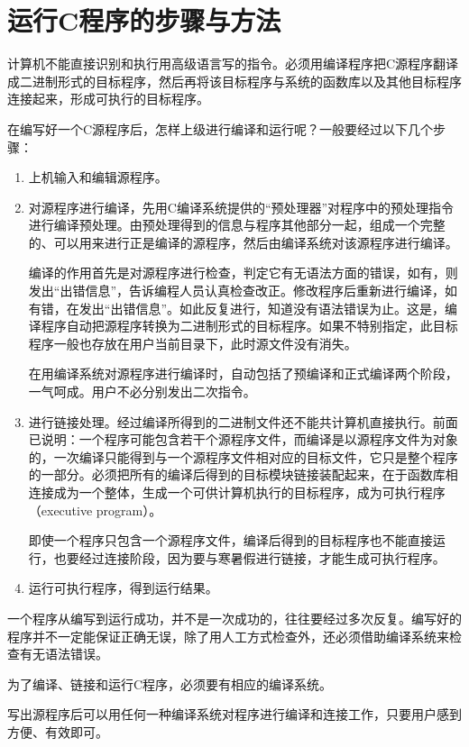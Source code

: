 \section{运行C程序的步骤与方法}

 计算机不能直接识别和执行用高级语言写的指令。必须用编译程序把C源程序翻译成二进制形式的目标程序，然后再将该目标程序与系统的函数库以及其他目标程序连接起来，形成可执行的目标程序。

 在编写好一个C源程序后，怎样上级进行编译和运行呢？一般要经过以下几个步骤：
\begin{enumerate}
	\item 	上机输入和编辑源程序。
	\item 对源程序进行编译，先用C编译系统提供的“预处理器”对程序中的预处理指令进行编译预处理。由预处理得到的信息与程序其他部分一起，组成一个完整的、可以用来进行正是编译的源程序，然后由编译系统对该源程序进行编译。

 编译的作用首先是对源程序进行检查，判定它有无语法方面的错误，如有，则发出“出错信息”，告诉编程人员认真检查改正。修改程序后重新进行编译，如有错，在发出“出错信息”。如此反复进行，知道没有语法错误为止。这是，编译程序自动把源程序转换为二进制形式的目标程序。如果不特别指定，此目标程序一般也存放在用户当前目录下，此时源文件没有消失。

 在用编译系统对源程序进行编译时，自动包括了预编译和正式编译两个阶段，一气呵成。用户不必分别发出二次指令。

	\item 进行链接处理。经过编译所得到的二进制文件还不能共计算机直接执行。前面已说明：一个程序可能包含若干个源程序文件，而编译是以源程序文件为对象的，一次编译只能得到与一个源程序文件相对应的目标文件，它只是整个程序的一部分。必须把所有的编译后得到的目标模块链接装配起来，在于函数库相连接成为一个整体，生成一个可供计算机执行的目标程序，成为可执行程序（executive program）。

 即使一个程序只包含一个源程序文件，编译后得到的目标程序也不能直接运行，也要经过连接阶段，因为要与寒暑假进行链接，才能生成可执行程序。
	\item 运行可执行程序，得到运行结果。
\end{enumerate}

 一个程序从编写到运行成功，并不是一次成功的，往往要经过多次反复。编写好的程序并不一定能保证正确无误，除了用人工方式检查外，还必须借助编译系统来检查有无语法错误。

 为了编译、链接和运行C程序，必须要有相应的编译系统。

 写出源程序后可以用任何一种编译系统对程序进行编译和连接工作，只要用户感到方便、有效即可。

